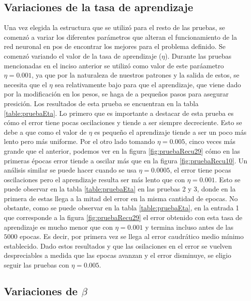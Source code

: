 \documentclass[11pt,a4paper]{article}
\begin{document}
\subsection{Variaciones de la tasa de aprendizaje}
Una vez elegida la estructura que se utilizó para el resto de las pruebas, se comenzó a variar los diferentes parámetros que alteran el funcionamiento de la red neuronal en pos de encontrar los mejores para el problema definido. Se comenzó variando el valor de la tasa de aprendizaje ($\eta$). Durante las pruebas mencionadas en el inciso anterior se utilizó como valor de este paráametro $\eta = 0.001$, ya que por la naturaleza de nuestros patrones y la salida de estos, se necesita que el $\eta$ sea relativamente bajo para que el aprendizaje, que viene dado por la modificación en los pesos, se haga de a pequeños pasos para asegurar presición. Los resultados de esta prueba se encuentran en la tabla \ref{table:pruebaEta}. Lo primero que es importante a destacar de esta prueba es cómo el error tiene pocas oscilaciones y tiende a ser siempre decreciente. Esto se debe a que como el valor de $\eta$ es pequeño el aprendizaje tiende a ser un poco más lento pero más uniforme. Por el otro lado tomando $\eta = 0.005$, cinco veces más grande que el anterior, podemos ver en la figura \ref{fig:pruebaRecu29} cómo en las primeras épocas error tiende a oscilar más que en la figura \ref{fig:pruebaRecu10}. Un análisis similar se puede hacer cuando se usa $\eta = 0.0005$, el error tiene pocas oscilaciones pero el aprendizaje resulta ser más lento que con $\eta =  0.001$. Esto se puede observar en la tabla \ref{table:pruebaEta} en las pruebas 2 y 3, donde en la primera de estas llega a la mitad del error en la misma cantidad de epocas. No obstante, como se puede observar en la tabla \ref{table:pruebaEta}, en la entrada 1 que corresponde a la figura \ref{fig:pruebaRecu29} el error obtenido con esta tasa de aprendizaje es mucho menor que con $\eta = 0.001$ y termina incluso antes de las $5000$ epocas. Es decir, por primera vez se llega al error caudrático medio mínimo establecido. Dado estos resultados y que las osilaciones en el error se vuelven despreciables a medida que las epocas avanzan y el error disminuye, se eligio seguir las pruebas con $\eta = 0.005$. 

\subsection{Variaciones de \texorpdfstring{$\beta$}{\emph{beta}}}
\end{document}
